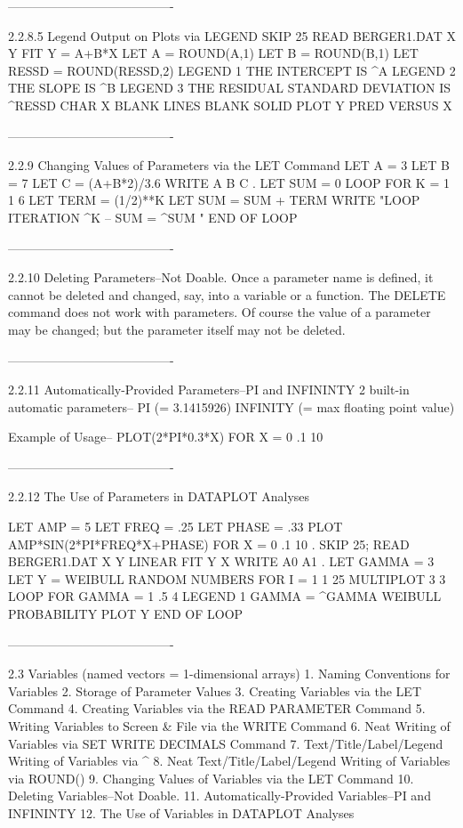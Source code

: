 ----------------------------------------
 
2.2.8.5
Legend Output on Plots via LEGEND
      SKIP 25
      READ BERGER1.DAT X Y
      FIT Y = A+B*X
      LET A = ROUND(A,1)
      LET B = ROUND(B,1)
      LET RESSD = ROUND(RESSD,2)
      LEGEND 1 THE INTERCEPT IS ^A
      LEGEND 2 THE SLOPE IS ^B
      LEGEND 3 THE RESIDUAL STANDARD DEVIATION IS ^RESSD
      CHAR X BLANK
      LINES BLANK SOLID
      PLOT Y PRED VERSUS X
 
----------------------------------------
 
2.2.9
Changing Values of Parameters via the LET Command
      LET A = 3
      LET B = 7
      LET C = (A+B*2)/3.6
      WRITE A B C
      .
      LET SUM = 0
      LOOP FOR K = 1 1 6
      LET TERM = (1/2)**K
      LET SUM = SUM + TERM
      WRITE "LOOP ITERATION ^K --   SUM = ^SUM "
      END OF LOOP
 
----------------------------------------
 
2.2.10
Deleting Parameters--Not Doable.
   Once a parameter name is defined, it cannot be deleted
   and changed, say, into a variable or a function.
   The DELETE command does not work with parameters.
   Of course the value of a parameter may be changed;
   but the parameter itself may not be deleted.
 
----------------------------------------
 
2.2.11
Automatically-Provided Parameters--PI and INFININTY
   2 built-in automatic parameters--
      PI (= 3.1415926)
      INFINITY  (= max floating point value)
 
   Example of Usage--
      PLOT(2*PI*0.3*X) FOR X = 0 .1 10
 
----------------------------------------
 
2.2.12
The Use of Parameters in DATAPLOT Analyses
 
      LET AMP = 5
      LET FREQ = .25
      LET PHASE = .33
      PLOT AMP*SIN(2*PI*FREQ*X+PHASE) FOR X = 0 .1 10
      .
      SKIP 25; READ BERGER1.DAT X Y
      LINEAR FIT Y X
      WRITE A0 A1
      .
      LET GAMMA = 3
      LET Y = WEIBULL RANDOM NUMBERS FOR I = 1 1 25
      MULTIPLOT 3 3
      LOOP FOR GAMMA = 1 .5 4
      LEGEND 1 GAMMA = ^GAMMA
      WEIBULL PROBABILITY PLOT Y
      END OF LOOP
 
----------------------------------------
 
2.3
Variables (named vectors = 1-dimensional arrays)
   1. Naming Conventions for Variables
   2. Storage of Parameter Values
   3. Creating Variables via the LET Command
   4. Creating Variables via the READ PARAMETER Command
   5. Writing Variables to Screen & File via the WRITE Command
   6. Neat Writing of Variables via SET WRITE DECIMALS Command
   7. Text/Title/Label/Legend Writing of Variables via ^
   8. Neat Text/Title/Label/Legend Writing of Variables via ROUND()
   9. Changing Values of Variables via the LET Command
  10. Deleting Variables--Not Doable.
  11. Automatically-Provided Variables--PI and INFININTY
  12. The Use of Variables in DATAPLOT Analyses
 
